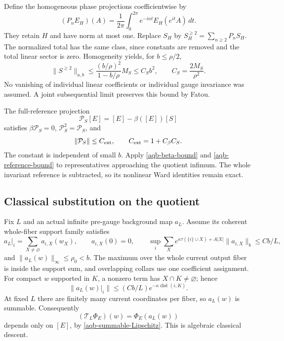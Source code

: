 \documentclass[11pt]{article}
\theoremstyle{remark}
\begin{document}
Define the homogeneous phase projections coefficientwise by
\begin{equation}
 (P_nE_H)(A)=\frac1{2\pi}\int_0^{2\pi}
                     e^{-int}E_H(e^{it}A)\,dt.
 \label{aqb-phase-projection}
\end{equation}
They retain $H$ and have norm at most one. Replace $S_H$ by
$S_H^{\ge2}=\sum_{n\ge2}P_nS_H$. The normalized total has
the same class, since constants are removed and the total
linear sector is zero. Homogeneity yields, for $b\le\rho/2$,
\begin{equation}
 \|S^{\ge2}\|_{a,b}
 \le\frac{(b/\rho)^2}{1-b/\rho}M_S
 \le C_Sb^2,
 \qquad C_S=\frac{2M_S}{\rho^2}.
 \label{aqb-reference-bound}
\end{equation}
No vanishing of individual linear coefficients or individual
gauge invariance was assumed. A joint subsequential limit
preserves this bound by Fatou.

The full-reference projection
\begin{equation}
 \mathcal P_S[E]=[E]-\beta([E])[S]
 \label{aqb-extraction}
\end{equation}
satisfies $\beta\mathcal P_S=0$, $\mathcal P_S^2=\mathcal P_S$,
and
\begin{equation}
 \|\mathcal P_S\|\le C_{\rm ext},
 \qquad C_{\rm ext}=1+C_\beta C_S.
 \label{aqb-extraction-bound}
\end{equation}
The constant is independent of small $b$. Apply
\eqref{aqb-beta-bound} and \eqref{aqb-reference-bound} to
representatives approaching the quotient infimum. The whole
invariant reference is subtracted, so its nonlinear Ward
identities remain exact.

\subsection{Classical substitution on the quotient}
\label{aqb-descent-section}

Fix $L$ and an actual infinite pre-gauge background map $a_L$.
Assume its coherent whole-fiber support family satisfies
\begin{equation}
 a_L|_i=\sum_{X\ne\varnothing}a_{i,X}(w_X),\qquad
 a_{i,X}(0)=0,\qquad
 \sup_i\sum_X e^{\kappa\tau(\{i\}\cup X)+A|X|}
                \|a_{i,X}\|_b\le Cb/L,
 \label{aqb-background-family}
\end{equation}
and $\|a_L(w)\|_\infty\le\rho_0<b$. The maximum over the
whole current output fiber is inside the support sum, and
overlapping collars use one coefficient assignment. For compact
$w$ supported in $K$, a nonzero term has $X\cap K\ne\varnothing$;
hence
\begin{equation}
 \|a_L(w)|_i\|\le(Cb/L)e^{-\kappa\operatorname{dist}(i,K)}.
 \label{aqb-background-summability}
\end{equation}
At fixed $L$ there are finitely many current coordinates per
fiber, so $a_L(w)$ is summable. Consequently
\begin{equation}
 (\mathcal T_L\Phi_E)(w)=\Phi_E(a_L(w))
 \label{aqb-scalar-substitution}
\end{equation}
depends only on $[E]$, by \eqref{aqb-summable-Lipschitz}.
This is algebraic classical descent.
\end{document}
